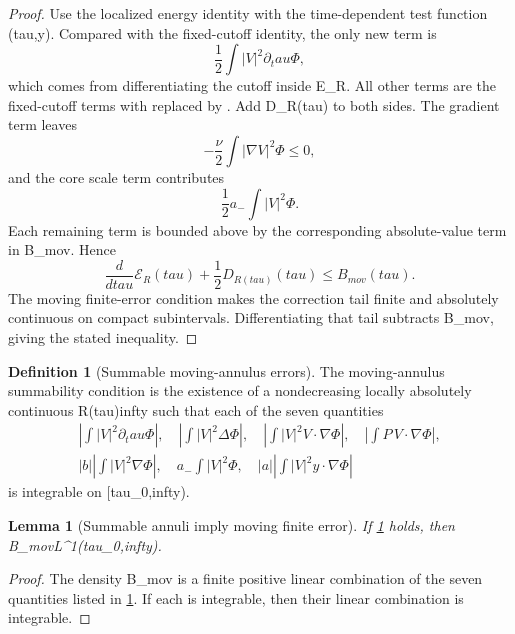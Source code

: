 \documentclass[11pt]{amsart}
\def\({}%
\def\){}%
\def\tilde#1{#1}%
\def\mathfrak#1{#1}%
\def\mathrm#1{#1}%
\def\tau{tau}%
\def\infty{infty}%
\theoremstyle{plain}
\newtheorem{lemma}[theorem]{Lemma}
\theoremstyle{definition}
\newtheorem{definition}[theorem]{Definition}
\theoremstyle{remark}
\begin{document}
\begin{proof}
Use the localized energy identity with the time-dependent test function
\(\Phi(\tau,y)\).  Compared with the fixed-cutoff identity, the only new term
is
\[
  \frac12\int |V|^2\partial_\tau\Phi,
\]
which comes from differentiating the cutoff inside \(\mathcal E_R\).  All
other terms are the fixed-cutoff terms with \(\phi\) replaced by \(\Phi\).  Add
\(\tilde{\mathfrak D}_{R(\tau)}\) to both sides.  The gradient term
leaves
\[
  -\frac{\nu}{2}\int|\nabla V|^2\Phi\le0,
\]
and the core scale term contributes
\[
  \frac12a_-\int |V|^2\Phi .
\]
Each remaining term is bounded above by the corresponding absolute-value term
in \(B_{\mathrm{mov}}\).  Hence
\[
  \frac{d}{d\tau}\mathcal E_R(\tau)
  +\frac12\tilde{\mathfrak D}_{R(\tau)}(\tau)
  \le B_{\mathrm{mov}}(\tau).
\]
The moving finite-error condition makes the correction tail finite and
absolutely continuous on compact subintervals.  Differentiating that tail
subtracts \(B_{\mathrm{mov}}\), giving the stated inequality.
\end{proof}

\begin{definition}[Summable moving-annulus errors]\label{paper6a:def:summable-moving-errors}
The moving-annulus summability condition is the existence of a nondecreasing
locally absolutely continuous \(R(\tau)\to\infty\) such that each of the seven
quantities
\[
\begin{gathered}
  \left|\int |V|^2\partial_\tau\Phi\right|,\quad
  \left|\int |V|^2\Delta\Phi\right|,\quad
  \left|\int |V|^2V\cdot\nabla\Phi\right|,\quad
  \left|\int P\,V\cdot\nabla\Phi\right|,\\
  |b|\left|\int |V|^2\nabla\Phi\right|,\quad
  a_-\int |V|^2\Phi,\quad
  |a|\left|\int |V|^2y\cdot\nabla\Phi\right|
\end{gathered}
\]
is integrable on \([\tau_0,\infty)\).
\end{definition}

\begin{lemma}[Summable annuli imply moving finite error]
\label{paper6a:lem:summable-moving-errors}
If \cref{paper6a:def:summable-moving-errors} holds, then
\(B_{\mathrm{mov}}\in L^1(\tau_0,\infty)\).
\end{lemma}

\begin{proof}
The density \(B_{\mathrm{mov}}\) is a finite positive linear combination of
the seven quantities listed in
\cref{paper6a:def:summable-moving-errors}.  If each is integrable, then their
linear combination is integrable.
\end{proof}
\end{document}

